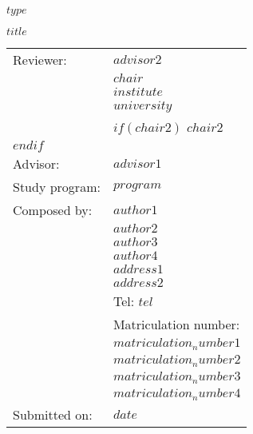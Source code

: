 \documentclass[a4paper,12pt]{article}
\begin{document}
\thispagestyle{empty}
\begin{center}
  $type$ \vspace{0.5cm} \\\vspace{1.5cm}

  {\Large{\bf $title$}} \\\vspace{2.5cm} 

\begin{table*}[!ht]
  \centering
    \begin{tabular}{ll}
      Reviewer: & $advisor2$ \\
                & $chair$ \\
                & $institute$ \\
                & $university$ \\
                & $if(chair2)$ $chair2$ \\ $endif$ \vspace{0.5cm}\\
      
      Advisor: & $advisor1$ \vspace{0.5cm}\\
      
      Study program: & $program$ \vspace{0.5cm}\\
      
      Composed by: & $author1$ \\
                   & $author2$ \\
                   & $author3$ \\
                   & $author4$ \vspace{0.2cm}\\
                   & $address1$ \\
                   & $address2$ \vspace{0.2cm}\\
                   & Tel: $tel$ \vspace{0.2cm}\\
                   & Matriculation number: \\
                   & $matriculation_number1$ \\
                   & $matriculation_number2$ \\
                   & $matriculation_number3$ \\
                   & $matriculation_number4$ \vspace{0.5cm}\\
                   \addlinespace
                   
      Submitted on: & $date$\\
    \end{tabular}
\end{table*}
\end{center}
\end{document}
